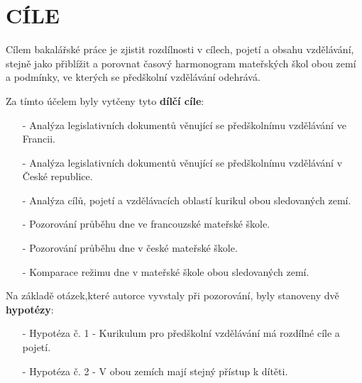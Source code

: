 \chapter{CÍLE}

Cílem bakalářské práce je zjistit rozdílnosti v cílech, pojetí a obsahu vzdělávání, stejně jako přiblížit a porovnat časový harmonogram mateřských škol obou zemí a podmínky, ve kterých se předškolní vzdělávání odehrává. 

Za tímto účelem byly vytčeny tyto \textbf{dílčí cíle}:

\begin{itemize}
	\setlength\itemsep{-2mm}
	\item [-] Analýza legislativních dokumentů věnující se předškolnímu vzdělávání ve Francii.
	\item [-] Analýza legislativních dokumentů věnující se předškolnímu vzdělávání v České republice.
	\item [-] Analýza cílů, pojetí a vzdělávacích oblastí kurikul obou sledovaných zemí.
	\item [-] Pozorování průběhu dne ve francouzské mateřské škole.
	\item [-] Pozorování průběhu dne v české mateřské škole. 
	\item [-] Komparace režimu dne v mateřské škole obou sledovaných zemí.
\end{itemize}


Na základě otázek,které autorce vyvstaly při pozorování, byly stanoveny dvě \textbf{hypotézy}:

\begin{itemize}
\item[-] Hypotéza č. 1 - Kurikulum pro předškolní vzdělávání má rozdílné cíle a pojetí.
\item[-] Hypotéza č. 2 - V obou zemích mají stejný přístup k dítěti. 
\end{itemize}
